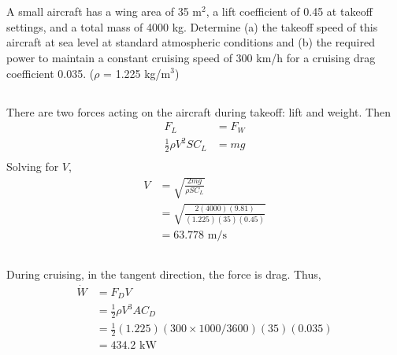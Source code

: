 \section{}
A small aircraft has a wing area of 35 m$^2$, a lift coefficient of 0.45 at takeoff settings, and a 
total mass of 4000 kg. Determine (a) the takeoff speed of this aircraft at sea level at standard 
atmospheric conditions and (b) the required power to maintain a constant cruising speed of 300 km/h 
for a cruising drag coefficient 0.035. ($\rho$ = 1.225 kg/m$^3$)

\subsection{}
There are two forces acting on the aircraft during takeoff: lift and weight. Then
\begin{align*}
    F_L &= F_W \\
    \frac{1}{2} \rho V^2 S C_L &= mg \\
\end{align*}
Solving for $V$,
\begin{align*}
    V &= \sqrt{\frac{2mg}{\rho S C_L}} \\
        &= \sqrt{\frac{2(4000)(9.81)}{(1.225)(35)(0.45)}} \\
        &= 63.778 \text{ m/s}
\end{align*}

\subsection{}
During cruising, in the tangent direction, the force is drag. Thus,
\begin{align*}
    \dot{W} &= F_D V \\
    &= \frac{1}{2} \rho V^3 A C_D \\
    &= \frac{1}{2} (1.225) (300 \times 1000/3600) (35) (0.035) \\
    &= 434.2 \text{ kW}
\end{align*}


